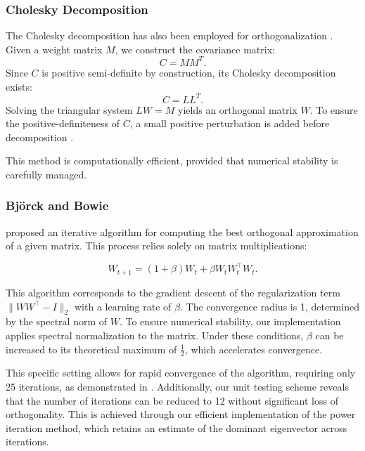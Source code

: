     \subsubsection{Cholesky Decomposition}
        
        The Cholesky decomposition %
        has also been employed for orthogonalization \cite{hu_recipe_2023}. Given a weight matrix $M$, we construct the covariance matrix:
        \begin{equation}
            C = M M^T.
        \end{equation}
        Since $C$ is positive semi-definite by construction, its Cholesky decomposition exists:
        \begin{equation}
            C = L L^T.
        \end{equation}
        Solving the triangular system $L W = M$ yields an orthogonal matrix $W$. To ensure the positive-definiteness of $C$, a small positive perturbation is added before decomposition \cite{hu_recipe_2023}.
        
        This method is computationally efficient, provided that numerical stability is carefully managed.

    \subsubsection{Björck and Bowie}
        \cite{bjorck1971iterative} proposed an iterative algorithm for computing the best orthogonal approximation of a given matrix. This process relies solely on matrix multiplications:
        
        \[
            W_{t+1} = (1+\beta) W_t + \beta W_tW_t^\top W_t.
        \]
        
        This algorithm corresponds to the gradient descent of the regularization term \( \| WW^\top - I\|_2 \) with a learning rate of \( \beta \). The convergence radius is 1, determined by the spectral norm of \( W \). To ensure numerical stability, our implementation applies spectral normalization to the matrix. Under these conditions, \( \beta \) can be increased to its theoretical maximum of \( \frac{1}{2} \), which accelerates convergence.
        
        This specific setting allows for rapid convergence of the algorithm, requiring only 25 iterations, as demonstrated in \cite{anil_sorting_2019}. Additionally, our unit testing scheme reveals that the number of iterations can be reduced to 12 without significant loss of orthogonality. This is achieved through our efficient implementation of the power iteration method, which retains an estimate of the dominant eigenvector across iterations.

